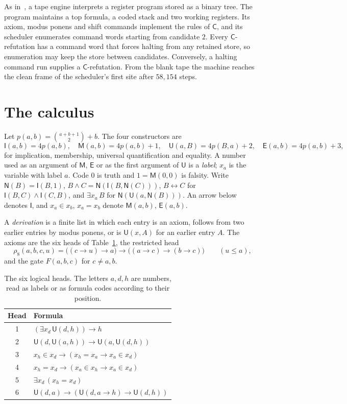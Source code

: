 \documentclass[11pt,letterpaper]{article}
\newcommand{\Ic}{\mathsf{I}}
\newcommand{\Mc}{\mathsf{M}}
\newcommand{\Uc}{\mathsf{U}}
\newcommand{\Ec}{\mathsf{E}}
\newcommand{\Nc}{\mathsf{N}}
\newcommand{\Cc}{\mathsf{C}}
\begin{document}
As in~\cite{pa209}, a tape engine interprets a register program stored as
a binary tree. The program maintains a top formula, a coded stack and two
working registers. Its axiom, modus ponens and shift commands implement
the rules of $\Cc$, and its scheduler enumerates command words starting
from candidate $2$. Every $\Cc$-refutation has a command word that forces
halting from any retained store, so enumeration may keep the store
between candidates. Conversely, a halting command run supplies a
$\Cc$-refutation. From the blank tape the machine reaches the clean frame
of the scheduler's first site after $58{,}154$ steps.

\section{The calculus}\label{sec:calculus}

Let $p(a,b)=\binom{a+b+1}{2}+b$. The four constructors are
\[
 \Ic(a,b)=4p(a,b),\quad \Mc(a,b)=4p(a,b)+1,\quad
 \Uc(a,B)=4p(B,a)+2,\quad \Ec(a,b)=4p(a,b)+3,
\]
for implication, membership, universal quantification and equality.
A number used as an argument of $\Mc$, $\Ec$ or as the first argument of
$\Uc$ is a \emph{label}; $x_a$ is the variable with label $a$. Code $0$ is
truth and $1=\Mc(0,0)$ is falsity. Write $\Nc(B)=\Ic(B,1)$,
$B\wedge C=\Nc(\Ic(B,\Nc(C)))$, $B\leftrightarrow C$ for
$\Ic(B,C)\wedge\Ic(C,B)$, and $\exists x_a\,B$ for $\Nc(\Uc(a,\Nc(B)))$.
An arrow below denotes $\Ic$, and $x_a\in x_b$, $x_a=x_b$ denote
$\Mc(a,b)$, $\Ec(a,b)$.

A \emph{derivation} is a finite list in which each entry is an axiom, follows
from two earlier entries by modus ponens, or is $\Uc(x,A)$ for an earlier
entry $A$. The axioms are the six heads of Table~\ref{tab:heads}, the
restricted head
\[
 \rho_8(a,b,c,u)=\bigl((c\to u)\to a\bigr)\to\bigl((a\to c)\to(b\to c)\bigr)
 \qquad(u\le a),
\]
and the gate $F(a,b,c)$ for $c\ne a,b$.

\begin{table}[ht]
\centering\small
\begin{tabular}{@{}cl@{}}
\toprule
Head & Formula \\
\midrule
1 & $(\exists x_d\,\Uc(d,h))\to h$ \\
2 & $\Uc(d,\Uc(a,h))\to\Uc(a,\Uc(d,h))$ \\
3 & $x_h\in x_d\to(x_h=x_a\to x_a\in x_d)$ \\
4 & $x_h=x_d\to(x_a\in x_h\to x_a\in x_d)$ \\
5 & $\exists x_d\,(x_h=x_d)$ \\
6 & $\Uc(d,a)\to(\Uc(d,a\to h)\to\Uc(d,h))$ \\
\bottomrule
\end{tabular}
\caption{The six logical heads. The letters $a,d,h$ are numbers, read
as labels or as formula codes according to their position.}\label{tab:heads}
\end{table}
\end{document}
